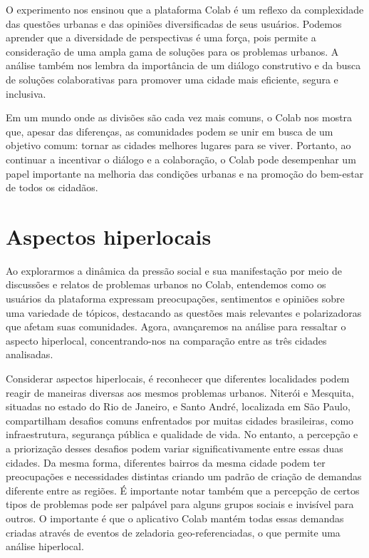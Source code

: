 O experimento nos ensinou que a plataforma Colab é um reflexo da complexidade das questões urbanas e das opiniões diversificadas de seus usuários. Podemos aprender que a diversidade de perspectivas é uma força, pois permite a consideração de uma ampla gama de soluções para os problemas urbanos. A análise também nos lembra da importância de um diálogo construtivo e da busca de soluções colaborativas para promover uma cidade mais eficiente, segura e inclusiva.

Em um mundo onde as divisões são cada vez mais comuns, o Colab nos mostra que, apesar das diferenças, as comunidades podem se unir em busca de um objetivo comum: tornar as cidades melhores lugares para se viver. Portanto, ao continuar a incentivar o diálogo e a colaboração, o Colab pode desempenhar um papel importante na melhoria das condições urbanas e na promoção do bem-estar de todos os cidadãos.

\section{Aspectos hiperlocais}

Ao explorarmos a dinâmica da pressão social e sua manifestação por meio de discussões e relatos de problemas urbanos no Colab, entendemos como os usuários da plataforma expressam preocupações, sentimentos e opiniões sobre uma variedade de tópicos, destacando as questões mais relevantes e polarizadoras que afetam suas comunidades. Agora, avançaremos na análise para ressaltar o aspecto hiperlocal, concentrando-nos na comparação entre as três cidades analisadas.

Considerar aspectos hiperlocais, é reconhecer que diferentes localidades podem reagir de maneiras diversas aos mesmos problemas urbanos. Niterói e Mesquita, situadas no estado do Rio de Janeiro, e Santo André, localizada em São Paulo, compartilham desafios comuns enfrentados por muitas cidades brasileiras, como infraestrutura, segurança pública e qualidade de vida. No entanto, a percepção e a priorização desses desafios podem variar significativamente entre essas duas cidades. Da mesma forma, diferentes bairros da mesma cidade podem ter preocupações e necessidades distintas criando um padrão de criação de demandas diferente entre as regiões. É importante notar também que a percepção de certos tipos de problemas pode ser palpável para alguns grupos sociais e invisível para outros. O importante é que o aplicativo Colab mantém todas essas demandas criadas através de eventos de zeladoria geo-referenciadas, o que permite uma análise hiperlocal.

